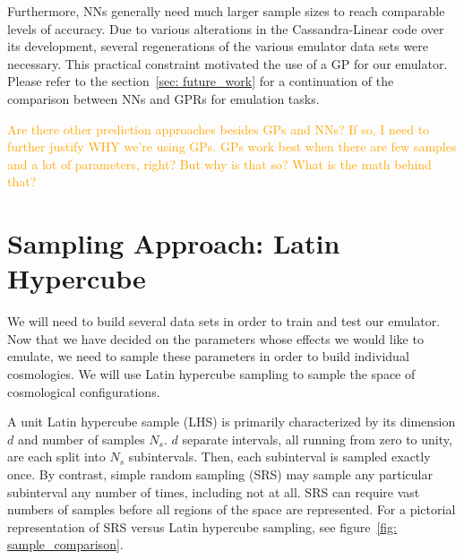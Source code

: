Furthermore, NNs generally need much larger sample sizes to reach comparable 
levels of accuracy. Due to various alterations in the Cassandra-Linear code 
over its development, several regenerations of the various emulator data sets 
were necessary. This practical constraint motivated the use of a GP for our
emulator. Please refer to the section~\ref{sec: future_work} for a
continuation of the comparison between NNs and GPRs for emulation tasks.

\textcolor{orange}{Are there other prediction approaches besides GPs and NNs? 
If so, I need to further justify WHY we’re using GPs.
GPs work best when there are few samples and a lot of 
parameters, right? But why is that so? What is the math behind that?}


\section{Sampling Approach: Latin Hypercube}
\label{sec: lhc_theory}

\begin{comment}
The computational complexity of inference and likelihood evaluation within GPR 
is cubic in the number of points \cbib{Barber}.
This makes GP regression an excellent companion to
Latin hypercube sampling (LHS), which makes highly efficient use of a limited 
number of samples.
\end{comment}

We will need to build several data sets in order to train and test our
emulator. Now that we have decided on the parameters whose effects we would
like to emulate, we need to sample these parameters in order to build
individual cosmologies. We will use Latin hypercube sampling to sample 
the space of cosmological configurations.

A unit Latin hypercube sample (LHS) is primarily characterized by its 
dimension $d$ and number of 
samples $N_s$. $d$ separate intervals, all running from zero to unity, are
each split into $N_s$ subintervals. Then, each subinterval is sampled
exactly once. By contrast, simple random sampling (SRS) may sample any 
particular subinterval any number of times, including not at all. SRS
can require vast numbers of samples before all regions of the space are
represented. For a pictorial representation of SRS versus Latin hypercube
sampling, see figure~\ref{fig: sample_comparison}.

